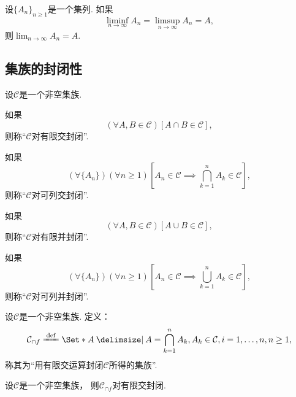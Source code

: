 \begin{theorem}
设\(\{A_n\}_{n\geq1}\)是一个集列.
如果\[
	\liminf_{n\to\infty} A_n
	= \limsup_{n\to\infty} A_n
	= A,
\]
则\(\lim_{n\to\infty} A_n = A\).
\end{theorem}

\subsection{集族的封闭性}
\begin{definition}[集族的封闭性]
设\(\mathcal{C}\)是一个非空集族.

如果\[
	(\forall A,B\in\mathcal{C})
	[A \cap B \in \mathcal{C}],
\]
则称“\(\mathcal{C}\)对有限交封闭”.

如果\[
	(\forall \{A_n\})
	(\forall n\geq1)
	\left[A_n\in\mathcal{C} \implies \bigcap_{k=1}^n A_k \in \mathcal{C}\right],
\]
则称“\(\mathcal{C}\)对可列交封闭”.

如果\[
	(\forall A,B\in\mathcal{C})
	[A \cup B \in \mathcal{C}],
\]
则称“\(\mathcal{C}\)对有限并封闭”.

如果\[
	(\forall \{A_n\})
	(\forall n\geq1)
	\left[A_n\in\mathcal{C} \implies \bigcup_{k=1}^n A_k \in \mathcal{C}\right],
\]
则称“\(\mathcal{C}\)对可列并封闭”.
\end{definition}

\begin{definition}
设\(\mathcal{C}\)是一个非空集族.
定义：\[
	\mathcal{C}_{\cap f}
	\defeq
	\Set*{
		A \given
		A = \bigcap_{k=1}^n A_k,
		A_k \in \mathcal{C}, i=1,\dotsc,n,
		n\geq1
	},
\]
称其为“用有限交运算封闭\(\mathcal{C}\)所得的集族”.
\end{definition}

\begin{proposition}
设\(\mathcal{C}\)是一个非空集族，
则\(\mathcal{C}_{\cap f}\)对有限交封闭.
\end{proposition}

